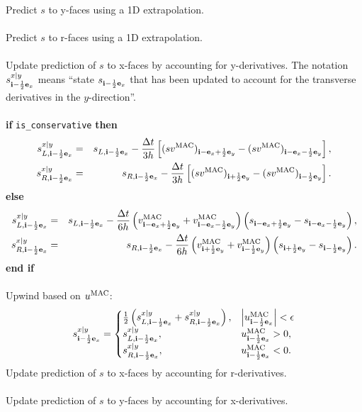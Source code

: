 Predict $s$ to y-faces using a 1D extrapolation.\\ \\
Predict $s$ to r-faces using a 1D extrapolation.\\ \\
Update prediction of $s$ to x-faces by accounting for y-derivatives.
The notation $s_{{\bf i}-\frac{1}{2}{\bf e}_x}^{x|y}$ means ``state $s_{{\bf i}-\frac{1}{2}{\bf e}_x}$
that has been updated to account for the transverse derivatives in 
the $y$-direction''.\\ \\
{\bf if} {\tt is\_conservative} {\bf then}
\begin{eqnarray}
s_{L,{\bf i}-\frac{1}{2}{\bf e}_x}^{x|y} &=& s_{L,{\bf i}-\frac{1}{2}{\bf e}_x} - \frac{\Delta t}{3h}\left[(sv^{\rm MAC})_{{\bf i}-{\bf e}_x+\frac{1}{2}{\bf e}_y}-(sv^{\rm MAC})_{{\bf i}-{\bf e}_x-\frac{1}{2}{\bf e}_y}\right], \\
s_{R,{\bf i}-\frac{1}{2}{\bf e}_x}^{x|y} &=& s_{R,{\bf i}-\frac{1}{2}{\bf e}_x} - \frac{\Delta t}{3h}\left[(sv^{\rm MAC})_{{\bf i}+\frac{1}{2}{\bf e}_y}-(sv^{\rm MAC})_{{\bf i}-\frac{1}{2}{\bf e}_y}\right].
\end{eqnarray}
{\bf else}
\begin{eqnarray}
s_{L,{\bf i}-\frac{1}{2}{\bf e}_x}^{x|y} &=& s_{L,{\bf i}-\frac{1}{2}{\bf e}_x} - \frac{\Delta t}{6h}\left(v_{{\bf i}-{\bf e}_x+\frac{1}{2}{\bf e}_y}^{\rm MAC} + v_{{\bf i}-{\bf e}_x-\frac{1}{2}{\bf e}_y}^{\rm MAC}\right)\left(s_{{\bf i}-{\bf e}_x+\frac{1}{2}{\bf e}_y} - s_{{\bf i}-{\bf e}_x-\frac{1}{2}{\bf e}_y}\right), \\
s_{R,{\bf i}-\frac{1}{2}{\bf e}_x}^{x|y} &=& s_{R,{\bf i}-\frac{1}{2}{\bf e}_x} - \frac{\Delta t}{6h}\left(v_{{\bf i}+\frac{1}{2}{\bf e}_y}^{\rm MAC} + v_{{\bf i}-\frac{1}{2}{\bf e}_y}^{\rm MAC}\right)\left(s_{{\bf i}+\frac{1}{2}{\bf e}_y} - s_{{\bf i}-\frac{1}{2}{\bf e}_y}\right).
\end{eqnarray}
{\bf end if}\\ \\
Upwind based on $u^{\rm MAC}$:
\begin{equation}
s_{{\bf i}-\frac{1}{2}{\bf e}_x}^{x|y} =
\begin{cases}
\frac{1}{2}\left(s_{L,{\bf i}-\frac{1}{2}{\bf e}_x}^{x|y} + s_{R,{\bf i}-\frac{1}{2}{\bf e}_x}^{x|y}\right), & \left|u^{\rm MAC}_{{\bf i}-\frac{1}{2}{\bf e}_x}\right| < \epsilon \\
s_{L,{\bf i}-\frac{1}{2}{\bf e}_x}^{x|y}, & u^{\rm MAC}_{{\bf i}-\frac{1}{2}{\bf e}_x} > 0, \\
s_{R,{\bf i}-\frac{1}{2}{\bf e}_x}^{x|y}, & u^{\rm MAC}_{{\bf i}-\frac{1}{2}{\bf e}_x} < 0.
\end{cases}
\end{equation}
Update prediction of $s$ to x-faces by accounting for r-derivatives.\\ \\
Update prediction of $s$ to y-faces by accounting for x-derivatives.\\ \\
